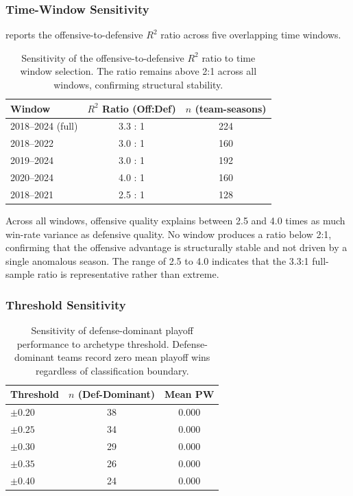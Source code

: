 \documentclass[12pt,a4paper]{article}
\begin{document}
\subsubsection{Time-Window Sensitivity}

 reports the offensive-to-defensive $R^2$ ratio across five overlapping time windows.

\begin{table}[htbp]
  \centering
  \caption{Sensitivity of the offensive-to-defensive $R^2$ ratio to time
           window selection. The ratio remains above 2:1 across all windows,
           confirming structural stability.}
  \label{tab:sensitivity-time}
  \begin{tabular}{lcc}
    \toprule
    \textbf{Window} & \textbf{$R^2$ Ratio (Off:Def)} & \textbf{$n$ (team-seasons)} \\
    \midrule
    2018--2024 (full)   & 3.3 : 1 & 224 \\
    2018--2022          & 3.0 : 1 & 160 \\
    2019--2024          & 3.0 : 1 & 192 \\
    2020--2024          & 4.0 : 1 & 160 \\
    2018--2021          & 2.5 : 1 & 128 \\
    \bottomrule
  \end{tabular}
\end{table}

Across all windows, offensive quality explains between 2.5 and 4.0 times as much win-rate variance as defensive quality. No window produces a ratio below 2:1, confirming that the offensive advantage is structurally stable and not driven by a single anomalous season. The range of 2.5 to 4.0 indicates that the 3.3:1 full-sample ratio is representative rather than extreme.

\subsubsection{Threshold Sensitivity}

\begin{table}[htbp]
  \centering
  \caption{Sensitivity of defense-dominant playoff performance to archetype
           threshold. Defense-dominant teams record zero mean playoff wins
           regardless of classification boundary.}
  \label{tab:sensitivity-threshold}
  \begin{tabular}{lcc}
    \toprule
    \textbf{Threshold} & \textbf{$n$ (Def-Dominant)} & \textbf{Mean PW} \\
    \midrule
    $\pm 0.20$ & 38  & 0.000 \\
    $\pm 0.25$ & 34  & 0.000 \\
    $\pm 0.30$ & 29  & 0.000 \\
    $\pm 0.35$ & 26  & 0.000 \\
    $\pm 0.40$ & 24  & 0.000 \\
    \bottomrule
  \end{tabular}
\end{table}
\end{document}
